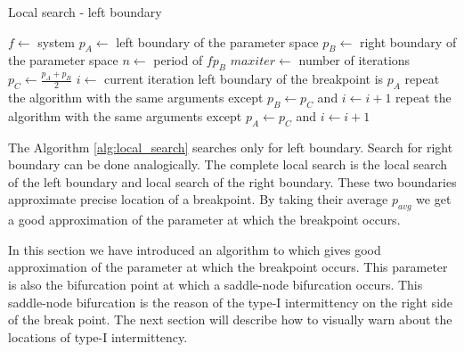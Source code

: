 \begin{algorithm}[!h]
    \caption{Local search - left boundary}
    \label{alg:local_search}
    \begin{algorithmic}[1]
        \Statex $f \gets$ system
        \Statex $p_{A} \gets$ left boundary of the parameter space
        \Statex $p_{B} \gets$ right boundary of the parameter space
        \Statex $n \gets$ period of $f{p_{B}}$
        \Statex $maxiter \gets$ number of iterations
        \State $p_{C} \gets \frac{p_{A}+p_{B}}{2}$
        \State $i \gets$ current iteration
            \State left boundary of the breakpoint is $p_{A}$
        \EndIf
            \State repeat the algorithm with the same arguments except $p_{B} \gets p_{C}$ and $i \gets i+1$
        \Else
            \State repeat the algorithm with the same arguments except $p_{A} \gets p_{C}$ and $i \gets i+1$
        \EndIf
    \end{algorithmic}
\end{algorithm}

\par
The Algorithm \ref{alg:local_search} searches only for left boundary. Search for right boundary can be done analogically.
The complete local search is the local search of the left boundary and local search of the right boundary.
These two boundaries approximate precise location of a breakpoint.
By taking their average $p_{avg}$ we get a good approximation of the parameter at which the breakpoint occurs.
\par
In this section we have introduced an algorithm to which gives good approximation of the parameter at which the breakpoint occurs.
This parameter is also the bifurcation point at which a saddle-node bifurcation occurs.
This saddle-node bifurcation is the reason of the type-I intermittency on the right side of the break point.
The next section will describe how to visually warn about the locations of type-I intermittency.

